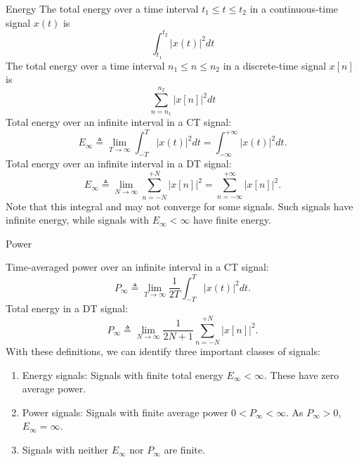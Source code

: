 \begin{frame}[allowframebreaks]{Energy}
    The total energy over a time interval $t_1 \leq t \leq t_2$ in a continuous-time signal $x(t)$ is
    \begin{equation*}
        \int_{t_1}^{t_2}|x(t)|^2dt
    \end{equation*}
    The total energy over a time interval $n_1 \leq n \leq n_2$ in a discrete-time signal $x[n]$ is
    \begin{equation*}
        \sum_{n= n_1}^{n_2}|x[n]|^2dt
    \end{equation*}
    Total energy  over an infinite interval in a CT signal:
    \begin{equation}
        E_\infty \triangleq \lim_{T \rightarrow \infty} \int_{-T}^{T}|x(t)|^2dt =  \int_{-\infty}^{+\infty}|x(t)|^2dt.
    \end{equation}
    Total energy  over an infinite interval in a DT signal:
    \begin{equation}
      E_\infty \triangleq \lim_{N \rightarrow \infty} \sum_{n = -N}^{+N}|x[n]|^2 =  \sum_{n=-\infty}^{+\infty}|x[n]|^2.
    \end{equation}
    Note that this integral and may not converge for some signals. Such signals have infinite energy, while signals with $E_\infty < \infty$ have finite energy.
\end{frame}


\begin{frame}{Power}

    Time-averaged power over an infinite interval in a CT signal:
    \begin{equation}
        P_\infty \triangleq \lim_{T \rightarrow \infty} \frac{1}{2T}\int_{-T}^{T}|x(t)|^2dt.
    \end{equation}
    Total energy in a DT signal:
    \begin{equation}
      P_\infty \triangleq \lim_{N \rightarrow \infty} \frac{1}{2N+1}\sum_{n = -N}^{+N}|x[n]|^2.
    \end{equation}
    With these definitions, we can identify three important classes of signals:
    {
    \begin{enumerate}
        \item Energy signals: Signals with finite total energy $E_\infty < \infty$. These have zero average power.
        \item Power signals: Signals with finite average power $0 < P_\infty < \infty$. As $P_\infty > 0$, $E_\infty = \infty$.
        \item Signals with neither $E_\infty$ nor $P_\infty$ are finite.
    \end{enumerate}
    }
\end{frame}


